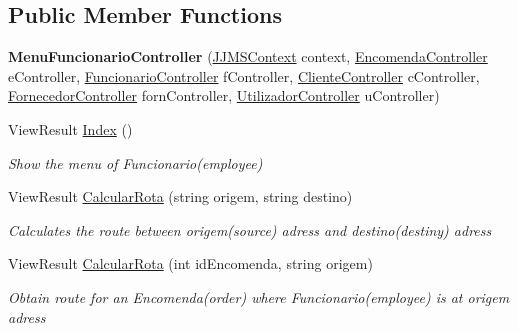 \subsection*{Public Member Functions}
\begin{DoxyCompactItemize}
\item 
\mbox{\label{classmvc_j_j_m_s_1_1_controllers_1_1_menu_funcionario_controller_a1ec34512098549061ef57e7b8ef07945}} 
{\bfseries Menu\+Funcionario\+Controller} (\mbox{\hyperlink{classmvc_j_j_m_s_1_1_data_1_1_j_j_m_s_context}{J\+J\+M\+S\+Context}} context, \mbox{\hyperlink{classmvc_j_j_m_s_1_1_controllers_1_1_encomenda_controller}{Encomenda\+Controller}} e\+Controller, \mbox{\hyperlink{classmvc_j_j_m_s_1_1_controllers_1_1_funcionario_controller}{Funcionario\+Controller}} f\+Controller, \mbox{\hyperlink{classmvc_j_j_m_s_1_1_controllers_1_1_cliente_controller}{Cliente\+Controller}} c\+Controller, \mbox{\hyperlink{classmvc_j_j_m_s_1_1_controllers_1_1_fornecedor_controller}{Fornecedor\+Controller}} forn\+Controller, \mbox{\hyperlink{classmvc_j_j_m_s_1_1_controllers_1_1_utilizador_controller}{Utilizador\+Controller}} u\+Controller)
\item 
View\+Result \mbox{\hyperlink{classmvc_j_j_m_s_1_1_controllers_1_1_menu_funcionario_controller_acdc18ba7b60c90728254ff66cf523c10}{Index}} ()
\begin{DoxyCompactList}\small\item\em Show the menu of Funcionario(employee) \end{DoxyCompactList}\item 
View\+Result \mbox{\hyperlink{classmvc_j_j_m_s_1_1_controllers_1_1_menu_funcionario_controller_aa3969c230e6f472ebe0241d6399e29c9}{Calcular\+Rota}} (string origem, string destino)
\begin{DoxyCompactList}\small\item\em Calculates the route between origem(source) adress and destino(destiny) adress \end{DoxyCompactList}\item 
View\+Result \mbox{\hyperlink{classmvc_j_j_m_s_1_1_controllers_1_1_menu_funcionario_controller_aafa0339ff14c5dfd9bb25a36efa89538}{Calcular\+Rota}} (int id\+Encomenda, string origem)
\begin{DoxyCompactList}\small\item\em Obtain route for an Encomenda(order) where Funcionario(employee) is at origem adress \end{DoxyCompactList}\item 

\end{DoxyCompactItemize}
